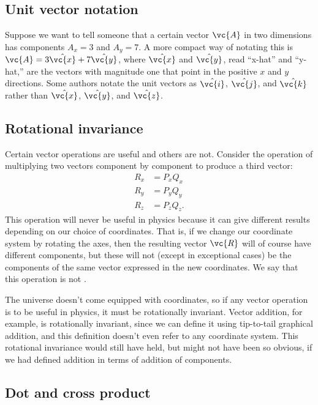\subsection{Unit vector notation}
Suppose we want to tell someone that a certain vector $\vc{A}$ in two dimensions
has components $A_x=3$ and $A_y=7$. A more compact way of notating this is
$\vc{A}=3\hat{\vc{x}}+7\hat{\vc{y}}$, where $\hat{\vc{x}}$ and $\hat{\vc{y}}$, read ``x-hat'' and ``y-hat,''
are the vectors with magnitude one that point in the positive $x$ and $y$
directions. Some authors notate the unit vectors as $\hat{\vc{i}}$, $\hat{\vc{j}}$, and $\hat{\vc{k}}$
rather than $\hat{\vc{x}}$, $\hat{\vc{y}}$, and $\hat{\vc{z}}$.

\subsection{Rotational invariance}

Certain vector operations
are useful and others are not. Consider the operation of
multiplying two vectors component by component to produce a third vector:
\begin{align*}
        R_x    &=    P_x Q_x  \\
        R_y    &=    P_y Q_y  \\
        R_z    &=    P_z Q_z.
\end{align*}
This operation will never be useful in physics because it can give different
results depending on our choice of coordinates. That is, if we change our coordinate
system by rotating the axes, then the resulting vector
$\vc{R}$ will of course have different components, but these will not (except in exceptional cases)
be the components of the same vector expressed in the new coordinates. We say that this
operation is not .

The universe doesn't come equipped with coordinates, so if any vector operation is to be useful in
physics, it must be rotationally invariant. Vector addition, for example, is rotationally invariant, since we
can define it using tip-to-tail graphical addition, and this definition doesn't even refer to any coordinate
system. This rotational invariance would still have held, but might not have been so obvious,
if we had defined addition in terms of addition of components.

\subsection{Dot and cross product}


